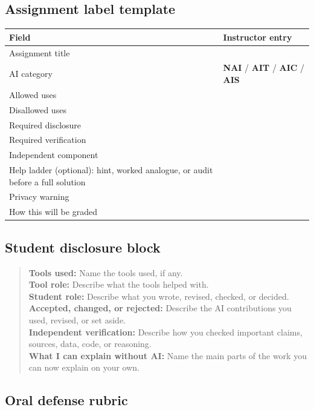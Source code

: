 \documentclass{SIAMbook2023}
\newcommand{\NAI}{\textcolor{catNAI}{\textbf{NAI}}}
\newcommand{\AIT}{\textcolor{catAIT}{\textbf{AIT}}}
\newcommand{\AIC}{\textcolor{catAIC}{\textbf{AIC}}}
\newcommand{\AIS}{\textcolor{catAIS}{\textbf{AIS}}}
\begin{document}
\subsection{Assignment label template}
\label{i:app:assignment-label}

\begin{longtable}{p{}p{}}
\toprule
\textbf{Field} & \textbf{Instructor entry} \\
\midrule
Assignment title & \\
AI category & \NAI{} / \AIT{} / \AIC{} / \AIS{} \\
Allowed uses & \\
Disallowed uses & \\
Required disclosure & \\
Required verification & \\
Independent component & \\
Help ladder (optional): hint, worked analogue, or audit before a full solution & \\
Privacy warning & \\
How this will be graded & \\
\bottomrule
\end{longtable}

\subsection{Student disclosure block}
\label{i:app:disclosure}

\begin{quote}
\textbf{Tools used:} Name the tools used, if any.\\
\textbf{Tool role:} Describe what the tools helped with.\\
\textbf{Student role:} Describe what you wrote, revised, checked, or decided.\\
\textbf{Accepted, changed, or rejected:} Describe the AI contributions you used, revised, or set aside.\\
\textbf{Independent verification:} Describe how you checked important claims, sources, data, code, or reasoning.\\
\textbf{What I can explain without AI:} Name the main parts of the work you can now explain on your own.
\end{quote}

\subsection{Oral defense rubric}
\label{i:app:oral-rubric}
\end{document}
